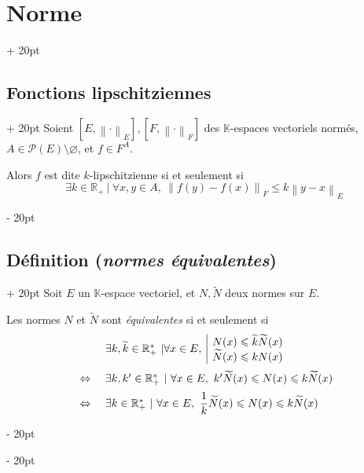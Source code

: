 \documentclass[a4paper, 12pt, twoside]{article}
\newcommand{\R}{\mathbb{R}} %
\newcommand{\K}{\mathbb K}
\newcommand{\lrb}[1]{\left[ #1 \right]}
\newcommand{\norm}[1]{\left\lVert #1 \right\rVert}
\newcommand{\ssi}{\ \Leftrightarrow \ }
\renewcommand{\le}{\leqslant}
\newcommand{\ind}[1][20pt]{\advance\leftskip + #1}
\newcommand{\deind}[1][20pt]{\advance\leftskip - #1}
\newenvironment{indt}[2][20pt]{#2 \par \ind[#1]}{\par \deind} %
\begin{document}
\begin{indt}{\section{Norme}}
        \vspace{12pt}
        
        \begin{indt}{\subsection{Fonctions lipschitziennes}}
            Soient $\lrb{E, \norm \cdot _E}, \lrb{F, \norm \cdot _F}$ des $\K$-espaces vectoriels normés, $A \in \mathcal P(E) \setminus \varnothing$, et $f \in F^A$.

            Alors $f$ est dite $k$-lipschitzienne si et seulement si
            \[
                \exists k \in \R_+\ |\ \forall x, y \in A,\
                \norm{f(y) - f(x)}_F \le k\norm{y - x}_E
            \]
        \end{indt}

        \vspace{12pt}
        
        \begin{indt}{\subsection{Définition (\textit{normes équivalentes})}}
            Soit $E$ un $\K$-espace vectoriel, et $N, \widetilde N$ deux normes sur $E$.

            Les normes $N$ et $\widetilde N$ sont \emph{équivalentes} si et seulement si
            \[
                \begin{array}{cl}
                    &
                    \exists k, \widetilde k \in \R^*_+\ |
                    \forall x \in E,\
                    \begin{array}{|l}
                        N(x) \le \widetilde k \widetilde N(x)
                        \\
                        \widetilde N(x) \le k N(x)
                    \end{array}
                    \vspace{6pt}
                    \\
                    \ssi&
                    \exists k, k' \in \R^*_+\ |\
                    \forall x \in E,\
                    k' \widetilde N(x) \le N(x) \le k \widetilde N(x)
                    \vspace{6pt}
                    \\
                    \ssi&
                    \exists k \in \R^*_+\ |\
                    \forall x \in E,\
                    \dfrac{1}{k} \widetilde N(x) \le N(x) \le k \widetilde N(x)
                \end{array}
            \]
        \end{indt}
    \end{indt}
\end{document}
